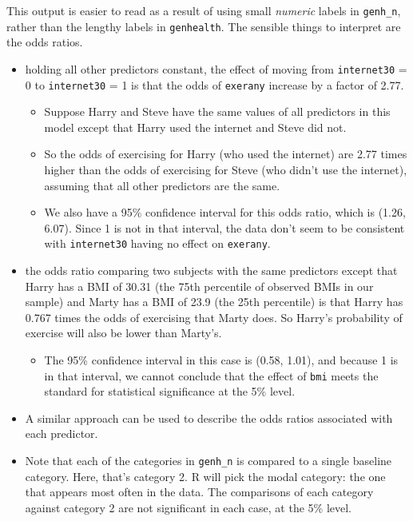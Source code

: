 \documentclass[]{book}
\providecommand{\tightlist}{%
  \setlength{\itemsep}{0pt}\setlength{\parskip}{0pt}}
\theoremstyle{definition}
\theoremstyle{definition}
\theoremstyle{definition}
\theoremstyle{remark}
\begin{document}
This output is easier to read as a result of using small \emph{numeric}
labels in \texttt{genh\_n}, rather than the lengthy labels in
\texttt{genhealth}. The sensible things to interpret are the odds
ratios.

\begin{itemize}
\tightlist
\item
  holding all other predictors constant, the effect of moving from
  \texttt{internet30} = 0 to \texttt{internet30} = 1 is that the odds of
  \texttt{exerany} increase by a factor of 2.77.

  \begin{itemize}
  \tightlist
  \item
    Suppose Harry and Steve have the same values of all predictors in
    this model except that Harry used the internet and Steve did not.
  \item
    So the odds of exercising for Harry (who used the internet) are 2.77
    times higher than the odds of exercising for Steve (who didn't use
    the internet), assuming that all other predictors are the same.
  \item
    We also have a 95\% confidence interval for this odds ratio, which
    is (1.26, 6.07). Since 1 is not in that interval, the data don't
    seem to be consistent with \texttt{internet30} having no effect on
    \texttt{exerany}.
  \end{itemize}
\item
  the odds ratio comparing two subjects with the same predictors except
  that Harry has a BMI of 30.31 (the 75th percentile of observed BMIs in
  our sample) and Marty has a BMI of 23.9 (the 25th percentile) is that
  Harry has 0.767 times the odds of exercising that Marty does. So
  Harry's probability of exercise will also be lower than Marty's.

  \begin{itemize}
  \tightlist
  \item
    The 95\% confidence interval in this case is (0.58, 1.01), and
    because 1 is in that interval, we cannot conclude that the effect of
    \texttt{bmi} meets the standard for statistical significance at the
    5\% level.
  \end{itemize}
\item
  A similar approach can be used to describe the odds ratios associated
  with each predictor.
\item
  Note that each of the categories in \texttt{genh\_n} is compared to a
  single baseline category. Here, that's category 2. R will pick the
  modal category: the one that appears most often in the data. The
  comparisons of each category against category 2 are not significant in
  each case, at the 5\% level.
\end{itemize}
\end{document}
